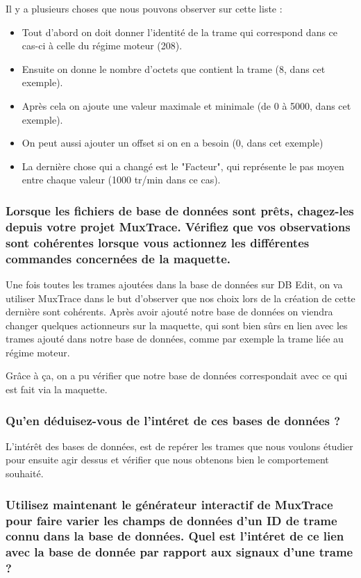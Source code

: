 \documentclass{rapportECC}
\begin{document}
Il y a plusieurs choses que nous pouvons observer sur cette liste :

\begin{itemize}
    \item Tout d'abord on doit donner l'identité de la trame qui correspond dans ce cas-ci à celle du régime moteur (208).
    \item Ensuite on donne le nombre d'octets que contient la trame (8, dans cet exemple).
    \item Après cela on ajoute  une valeur maximale et minimale (de 0 à 5000, dans cet exemple).
    \item On peut aussi ajouter un offset si on en a besoin (0, dans cet exemple)
    \item La dernière chose qui a changé est le "Facteur", qui représente le pas moyen entre chaque valeur (1000 tr/min dans ce cas).
\end{itemize}

\subsubsection*{Lorsque les fichiers de base de données sont prêts, chagez-les depuis votre projet MuxTrace. Vérifiez que vos observations sont cohérentes lorsque vous actionnez les différentes commandes concernées de la maquette.}

Une fois toutes les trames ajoutées dans la base de données sur DB Edit, on va utiliser MuxTrace dans le but d'observer que nos choix lors de la création de cette dernière sont cohérents.
Après avoir ajouté notre base de données on viendra changer quelques actionneurs sur la maquette, qui sont bien sûrs en lien avec les trames ajouté dans notre base de données, comme par exemple la trame liée au régime moteur.

Grâce à ça, on a pu vérifier que notre base de données correspondait avec ce qui est fait via la maquette.

\subsubsection*{Qu'en déduisez-vous de l'intéret de ces bases de données ?}

L'intérêt des bases de données, est de repérer les trames que nous voulons étudier pour ensuite agir dessus et vérifier que nous obtenons bien le comportement souhaité.

\subsubsection*{Utilisez maintenant le générateur interactif de MuxTrace pour faire varier les champs de données d'un ID de trame connu dans la base de données. Quel est l'intéret de ce lien avec la base de donnée par rapport aux signaux d'une trame ?}
\end{document}
